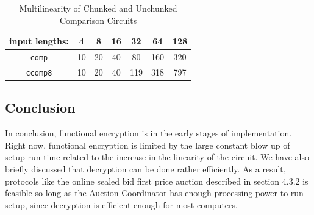 \documentclass[12pt,twoside]{reedthesis}
\begin{document}
 \begin{table}[h] %
\caption[Multilinearity of Different Comparison Circuits]{Multilinearity of Chunked and Unchunked Comparison Circuits} 
\begin{center} 
\begin{tabular}{c c c c c c c} 
\toprule %
  input lengths: &4 &8 & 16 & 32 &64 &128\\ %
  \midrule %
	\texttt{comp} &10 &20 &40 &80 &160 &320\\
	\texttt{ccomp8} &10 &20 &40 &119 &318 &797\\
		\bottomrule %
\end{tabular}
\end{center}
\label{inheritance} %
\end{table}





\subsection{Conclusion}
\par In conclusion, functional encryption is in the early stages of implementation. Right now, functional encryption is limited by the large constant blow up of setup run time related to the increase in the linearity of the circuit. We have also briefly discussed that decryption can be done rather efficiently. As a result, protocols like the online sealed bid first price auction described in section 4.3.2 is feasible so long as the Auction Coordinator has enough processing power to run setup, since decryption is efficient enough for most computers. 



 
\end{document}
